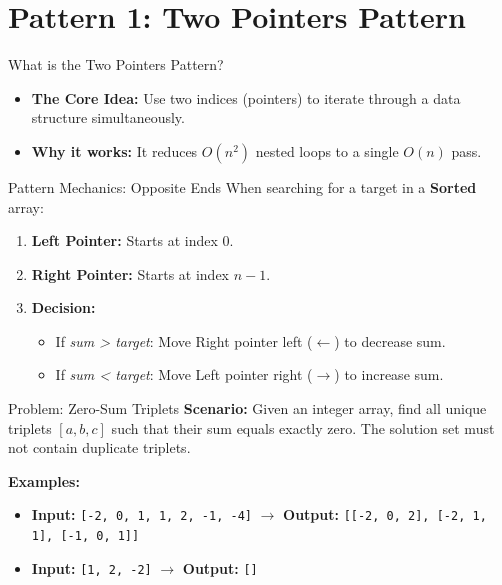\section{Pattern 1: Two Pointers Pattern}

\begin{frame}[c]{\empty}
    \begin{center}
        \Large\textbf{\secname}
    \end{center}
\end{frame}

\begin{frame}{What is the Two Pointers Pattern?}
  \begin{itemize}
    \item \textbf{The Core Idea:} Use two indices (pointers) to iterate through a data structure simultaneously.
    \item \textbf{Why it works:} It reduces $O(n^2)$ nested loops to a single $O(n)$ pass.
  \end{itemize}
\end{frame}

\begin{frame}{Pattern Mechanics: Opposite Ends}
  When searching for a target in a \textbf{Sorted} array:
  \begin{enumerate}
    \item \textbf{Left Pointer:} Starts at index $0$.
    \item \textbf{Right Pointer:} Starts at index $n-1$.
    \item \textbf{Decision:}
      \begin{itemize}
        \item If \textit{sum > target}: Move Right pointer left ($\leftarrow$) to decrease sum.
        \item If \textit{sum < target}: Move Left pointer right ($\rightarrow$) to increase sum.
      \end{itemize}
  \end{enumerate}
\end{frame}


\begin{frame}[fragile]{Problem: Zero-Sum Triplets}
  \textbf{Scenario:}
  Given an integer array, find all unique triplets $[a, b, c]$ such that their sum equals exactly zero. The solution set must not contain duplicate triplets.
  
  \vspace{0.3cm}
  \textbf{Examples:}
  \begin{itemize}
    \item \textbf{Input:} \texttt{[-2, 0, 1, 1, 2, -1, -4]} $\rightarrow$ \textbf{Output:} \texttt{[[-2, 0, 2], [-2, 1, 1], [-1, 0, 1]]}
    \item \textbf{Input:} \texttt{[1, 2, -2]} $\rightarrow$ \textbf{Output:} \texttt{[]}
  \end{itemize}
\end{frame}

